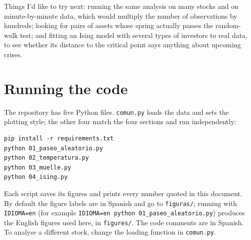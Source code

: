 \documentclass[11pt,a4paper]{article}
\begin{document}
Things I'd like to try next: running the same analysis on many stocks and on minute-by-minute data, which
would multiply the number of observations by hundreds; looking for pairs of assets whose spring actually
passes the random-walk test; and fitting an Ising model with several types of investors to real data, to
see whether its distance to the critical point says anything about upcoming crises.

\appendix
\section{Running the code}

The repository has five Python files. \texttt{comun.py} loads the data and sets the plotting style; the
other four match the four sections and run independently:
\begin{verbatim}
pip install -r requirements.txt
python 01_paseo_aleatorio.py
python 02_temperatura.py
python 03_muelle.py
python 04_ising.py
\end{verbatim}
Each script saves its figures and prints every number quoted in this document. By default the figure
labels are in Spanish and go to \texttt{figuras/}; running with \texttt{IDIOMA=en} (for example
\texttt{IDIOMA=en python 01\_paseo\_aleatorio.py}) produces the English figures used here, in
\texttt{figures/}. The code comments are in Spanish. To analyse a different stock, change the loading
function in \texttt{comun.py}.



\end{document}
